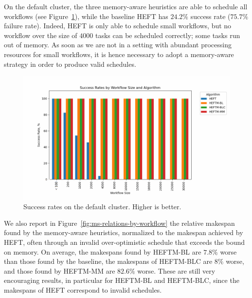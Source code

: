 \documentclass[conference]{IEEEtran}
\newcommand{\algo}[1]{\textsc{#1}}
\newcommand{\heft}{\algo{HEFT}\xspace}
\newcommand{\heftmm}{\algo{HEFTM-MM}\xspace}
\newcommand{\heftbl}{\algo{HEFTM-BL}\xspace}
\newcommand{\heftblc}{\algo{HEFTM-BLC}\xspace}
\begin{document}

    On the default cluster,  the three memory-aware heuristics are able to schedule all workflows
    (see Figure~\ref{fig:success-rates-large}), while
    the baseline \heft has $24.2\%$ success rate ($75.7\%$ failure rate).
    Indeed, \heft is only able to schedule small workflows, but no workflow over the size of $4000$ tasks
    can be scheduled correctly; some tasks run out of memory. As soon as we are not in a setting
    with abundant processing resources for small workflows, it is hence necessary to adopt
    a memory-aware strategy in order to produce valid schedules.

    \begin{figure}[tb]
        \centering
        \includegraphics[width=0.9\columnwidth] {images/success-rates-large}
        \caption{Success rates on the default cluster. Higher is better.}
        \label{fig:success-rates-large}
        \vspace{-0.3cm}
    \end{figure}

   We also report in  Figure~\ref{fig:ms-relations-by-workflow}  the relative makespan found
   by the memory-aware heuristics, normalized to the
   makespan achieved by \heft, often through an invalid over-optimistic schedule that exceeds
   the bound on memory.
    On average, the makespans found by \heftbl are $7.8\%$ worse than those found by the baseline,
    the makespans of \heftblc are $8\%$
    worse, and those found by \heftmm are $82.6\%$ worse. These are still very encouraging results,
    in particular for \heftbl and \heftblc, since the makespans of \heft correspond to invalid schedules.
\end{document}
